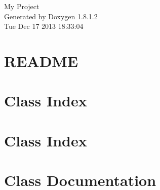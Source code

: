 \documentclass{book}
\begin{document}
\hypersetup{pageanchor=false,citecolor=blue}
\begin{titlepage}
\vspace*{7cm}
\begin{center}
{\Large My Project }\\
\vspace*{1cm}
{\large Generated by Doxygen 1.8.1.2}\\
\vspace*{0.5cm}
{\small Tue Dec 17 2013 18:33:04}\\
\end{center}
\end{titlepage}
\clearemptydoublepage
{}
\tableofcontents
\clearemptydoublepage
{}
\hypersetup{pageanchor=true,citecolor=blue}
\chapter{R\-E\-A\-D\-M\-E}
\label{md_README}
\hypertarget{md_README}{}

\chapter{Class Index}

\chapter{Class Index}

\chapter{Class Documentation}

























\printindex
\end{document}
